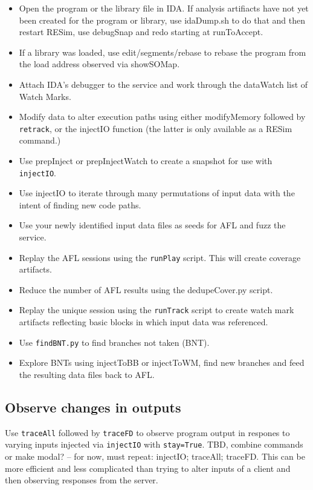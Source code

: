 \documentclass[titlepage]{article}
\begin{document}
\begin{itemize}
\item Open the program or the library file in IDA.  If analysis artifiacts have not yet
been created for the program or library, use idaDump.sh to do that and then restart RESim,
use debugSnap and redo starting at runToAccept. 

\item If a library was loaded, use edit/segments/rebase to rebase the program from the load address
observed via showSOMap.

\item Attach IDA's debugger to the service and work through the dataWatch list of Watch Marks.

\item Modify data to alter execution paths using either modifyMemory followed by {\tt retrack}, or the injectIO function (the latter
is only available as a RESim command.)  

\item Use prepInject or prepInjectWatch to create a snapshot for use with {\tt injectIO}.

\item Use injectIO to iterate through many permutations of input data with the intent of finding new code paths.

\item Use your newly identified input data files as seeds for AFL and fuzz the service.

\item Replay the AFL sessions using the {\tt runPlay} script.  This will create coverage artifacts.

\item Reduce the number of AFL results using the dedupeCover.py script.

\item Replay the unique session using the {\tt runTrack} script to create watch mark artifacts reflecting
basic blocks in which input data was referenced.

\item Use {\tt findBNT.py} to find branches not taken (BNT).

\item Explore BNTs using injectToBB or injectToWM, find new branches and feed the resulting data files
back to AFL.

\end{itemize}

\subsection{Observe changes in outputs}
Use {\tt traceAll} followed by {\tt traceFD} to observe program output in respones to varying inputs injected
via {\tt injectIO} with {\tt stay=True}. TBD, combine commands or make modal? -- for now, must repeat: injectIO;
traceAll; traceFD.  This can be more efficient and less complicated than trying to alter inputs of a client and then
observing responses from the server. 
\end{document}
